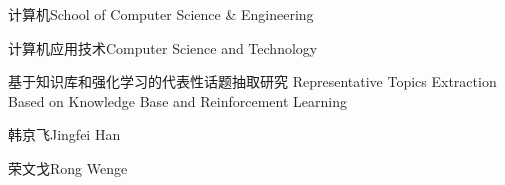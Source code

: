 
\school
{计算机}{School of Computer Science \& Engineering}

\major
{计算机应用技术}{Computer Science and Technology}

\thesistitle
{基于知识库和强化学习的代表性话题抽取研究}
{}
{Representative Topics Extraction Based on Knowledge Base and Reinforcement Learning}
{}

\thesisauthor
{韩京飞}{Jingfei Han}

\teacher
{荣文戈}{Rong Wenge}













